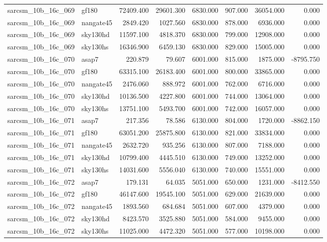 \begin{tabular}{llrrrrrr}
sarcsm\_10b\_16c\_069 & gf180 & 72409.400 & 29601.300 & 6830.000 & 907.000 & 36054.000 & 0.000 \\
sarcsm\_10b\_16c\_069 & nangate45 & 2849.420 & 1027.560 & 6830.000 & 878.000 & 6936.000 & 0.000 \\
sarcsm\_10b\_16c\_069 & sky130hd & 11597.100 & 4818.370 & 6830.000 & 799.000 & 12908.000 & 0.000 \\
sarcsm\_10b\_16c\_069 & sky130hs & 16346.900 & 6459.130 & 6830.000 & 829.000 & 15005.000 & 0.000 \\
sarcsm\_10b\_16c\_070 & asap7 & 220.879 & 79.607 & 6001.000 & 815.000 & 1875.000 & -8795.750 \\
sarcsm\_10b\_16c\_070 & gf180 & 63315.100 & 26183.400 & 6001.000 & 800.000 & 33865.000 & 0.000 \\
sarcsm\_10b\_16c\_070 & nangate45 & 2476.060 & 888.972 & 6001.000 & 762.000 & 6716.000 & 0.000 \\
sarcsm\_10b\_16c\_070 & sky130hd & 10136.500 & 4227.800 & 6001.000 & 744.000 & 13064.000 & 0.000 \\
sarcsm\_10b\_16c\_070 & sky130hs & 13751.100 & 5493.700 & 6001.000 & 742.000 & 16057.000 & 0.000 \\
sarcsm\_10b\_16c\_071 & asap7 & 217.356 & 78.586 & 6130.000 & 804.000 & 1720.000 & -8862.150 \\
sarcsm\_10b\_16c\_071 & gf180 & 63051.200 & 25875.800 & 6130.000 & 821.000 & 33834.000 & 0.000 \\
sarcsm\_10b\_16c\_071 & nangate45 & 2632.720 & 935.256 & 6130.000 & 807.000 & 7188.000 & 0.000 \\
sarcsm\_10b\_16c\_071 & sky130hd & 10799.400 & 4445.510 & 6130.000 & 749.000 & 13252.000 & 0.000 \\
sarcsm\_10b\_16c\_071 & sky130hs & 14031.600 & 5556.040 & 6130.000 & 740.000 & 15551.000 & 0.000 \\
sarcsm\_10b\_16c\_072 & asap7 & 179.131 & 64.035 & 5051.000 & 650.000 & 1231.000 & -8412.550 \\
sarcsm\_10b\_16c\_072 & gf180 & 46147.600 & 19545.100 & 5051.000 & 629.000 & 21639.000 & 0.000 \\
sarcsm\_10b\_16c\_072 & nangate45 & 1893.560 & 684.684 & 5051.000 & 607.000 & 4379.000 & 0.000 \\
sarcsm\_10b\_16c\_072 & sky130hd & 8423.570 & 3525.880 & 5051.000 & 584.000 & 9455.000 & 0.000 \\
sarcsm\_10b\_16c\_072 & sky130hs & 11025.000 & 4472.320 & 5051.000 & 577.000 & 10198.000 & 0.000 \\

\end{tabular}
